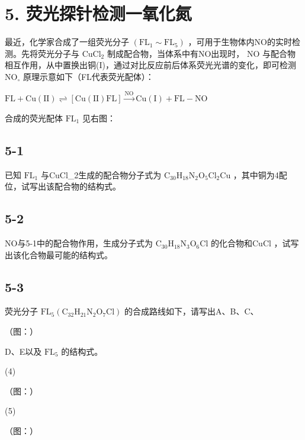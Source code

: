 \section*{5. 荧光探针检测一氧化氮}
最近，化学家合成了⼀组荧光分⼦ $\mathrm { ( F L _ { 1 } \sim F L _ { 5 } ) }$ ，可⽤于⽣物体内NO的实时检测。先将荧光分⼦与 $\mathrm { C u C l _ { 2 } }$ 制成配合物，当体系中有NO出现时， $\mathrm { N O }$ 与配合物相互作⽤，从中置换出铜(I)，通过对⽐反应前后体系荧光光谱的变化，即可检测 $\mathrm { N O } _ { \circ }$ 原理⽰意如下（FL代表荧光配体）：

$
\mathrm{FL} + \mathrm{Cu(II)} \rightleftharpoons [ \mathrm{Cu(II)FL} ] \xrightarrow {\mathrm{NO}} \mathrm{Cu(I)} + \mathrm{FL-NO}
$

合成的荧光配体 $\mathrm { F L _ { 1 } }$ ⻅右图：

\subsection*{5-1}
已知 $\mathrm { F L _ { 1 } }$ 与CuCl_{2}⽣成的配合物分⼦式为 $\mathrm { C _ { 3 0 } H _ { 1 8 } N _ { 2 } O _ { 5 } C l _ { 2 } C u }$ ，其中铜为4配位，试写出该配合物的结构式。

\subsection*{5-2}
NO与5-1中的配合物作⽤，⽣成分⼦式为 $\mathrm { C _ { 3 0 } H _ { 1 8 } N _ { 3 } O _ { 6 } C l }$ 的化合物和$\mathrm { C u C l }$ ，试写出该化合物最可能的结构式。

\subsection*{5-3}
荧光分⼦ $\mathrm { F L } _ { 5 } \left( \mathrm { C } _ { 3 2 } \mathrm { H } _ { 2 1 } \mathrm { N } _ { 2 } \mathrm { O } _ { 7 } \mathrm { C l } \right)$ 的合成路线如下，请写出A、B、C、

（图：）

D、E以及 $\mathrm { F L } _ { 5 }$ 的结构式。

()

（图：）

()

（图：）
